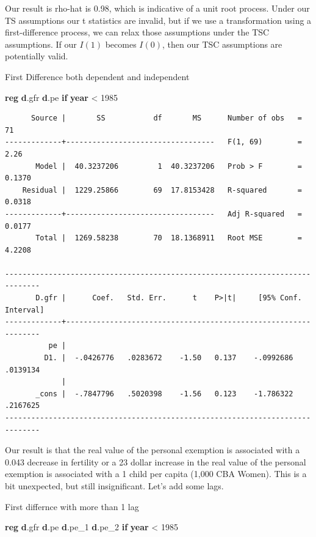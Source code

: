 \documentclass[
]{book}
\newenvironment{Shaded}{\begin{snugshade}}{\end{snugshade}}
\newcommand{\FunctionTok}[1]{\textcolor[rgb]{0.13,0.29,0.53}{\textbf{#1}}}
\newcommand{\KeywordTok}[1]{\textcolor[rgb]{0.13,0.29,0.53}{\textbf{#1}}}
\newcommand{\NormalTok}[1]{#1}
\begin{document}
Our result is rho-hat is 0.98, which is indicative of a unit root process.
Under our TS assumptions our t statistics are invalid, but if we use a
transformation using a first-difference process, we can relax those assumptions
under the TSC assumptions. If our \(I(1)\) becomes \(I(0)\), then our TSC assumptions
are potentially valid.

First Difference both dependent and independent

\begin{Shaded}
\begin{Highlighting}[]
\KeywordTok{reg} \KeywordTok{d}\NormalTok{.gfr }\KeywordTok{d}\NormalTok{.pe }\KeywordTok{if} \FunctionTok{year}\NormalTok{ \textless{} 1985}
\end{Highlighting}
\end{Shaded}

\begin{verbatim}
      Source |       SS           df       MS      Number of obs   =        71
-------------+----------------------------------   F(1, 69)        =      2.26
       Model |  40.3237206         1  40.3237206   Prob > F        =    0.1370
    Residual |  1229.25866        69  17.8153428   R-squared       =    0.0318
-------------+----------------------------------   Adj R-squared   =    0.0177
       Total |  1269.58238        70  18.1368911   Root MSE        =    4.2208

------------------------------------------------------------------------------
       D.gfr |      Coef.   Std. Err.      t    P>|t|     [95% Conf. Interval]
-------------+----------------------------------------------------------------
          pe |
         D1. |  -.0426776   .0283672    -1.50   0.137    -.0992686    .0139134
             |
       _cons |  -.7847796   .5020398    -1.56   0.123    -1.786322    .2167625
------------------------------------------------------------------------------
\end{verbatim}

Our result is that the real value of the personal exemption is associated with
a 0.043 decrease in fertility or a 23 dollar increase in the real value of the
personal exemption is associated with a 1 child per capita (1,000 CBA Women).
This is a bit unexpected, but still insignificant. Let's add some lags.

First differnce with more than 1 lag

\begin{Shaded}
\begin{Highlighting}[]
\KeywordTok{reg} \KeywordTok{d}\NormalTok{.gfr }\KeywordTok{d}\NormalTok{.pe }\KeywordTok{d}\NormalTok{.pe\_1 }\KeywordTok{d}\NormalTok{.pe\_2 }\KeywordTok{if} \FunctionTok{year}\NormalTok{ \textless{} 1985}
\end{Highlighting}
\end{Shaded}
\end{document}
